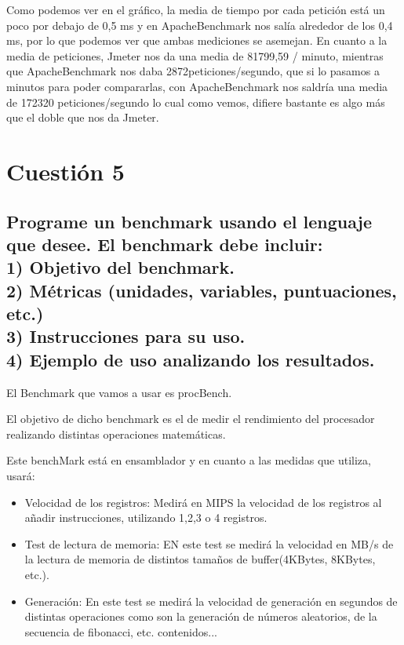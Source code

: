 Como podemos ver en el gráfico, la media de tiempo por cada petición está un poco por debajo de 0,5 ms y en ApacheBenchmark nos salía alrededor de los 0,4 ms, por lo que podemos ver que ambas mediciones se asemejan.
En cuanto a la media de peticiones, Jmeter nos da una media de 81799,59 / minuto, mientras que ApacheBenchmark nos daba 2872peticiones/segundo, que si lo pasamos a minutos para poder compararlas, con ApacheBenchmark nos saldría una media de 172320 peticiones/segundo lo cual como vemos, difiere bastante es algo más que el doble que nos da Jmeter.










\section{Cuestión 5}

\subsection{\Large Programe un benchmark usando el lenguaje que desee. El benchmark debe incluir:\\ 1) Objetivo del benchmark. \\2) Métricas (unidades, variables, puntuaciones, etc.) \\3) Instrucciones para su uso. \\4) Ejemplo de uso analizando los resultados.}

El Benchmark que vamos a usar es procBench.

El objetivo de dicho benchmark es el de medir el rendimiento del procesador realizando distintas operaciones matemáticas.

Este benchMark está en ensamblador y en cuanto a las medidas que utiliza, usará:
\begin{itemize}
	\item Velocidad de los registros: Medirá en MIPS la velocidad de los registros al añadir instrucciones, utilizando 1,2,3 o 4 registros.
	\item Test de lectura de memoria: EN este test se medirá la velocidad en MB/s de la lectura de memoria de distintos tamaños de buffer(4KBytes, 8KBytes, etc.).
	\item Generación: En este test se medirá la velocidad de generación en segundos de distintas operaciones como son la generación de números aleatorios, de la secuencia de fibonacci, etc.
	contenidos...
\end{itemize}

